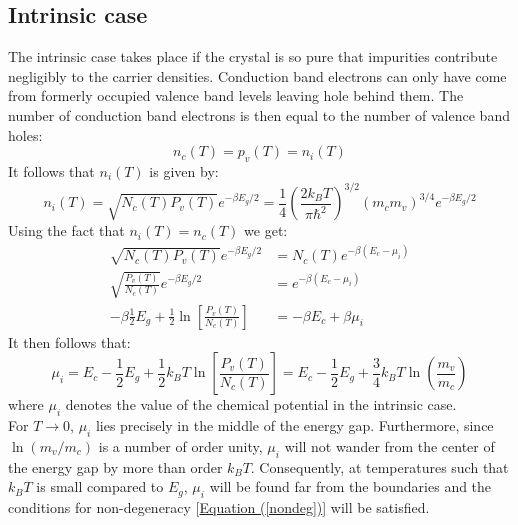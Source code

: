 \documentclass[10.75pt,a4paper,openright,bottom=2cm]{article}
\renewcommand{\refeq}[1]{\hyperref[#1]{Equation (\ref{#1})}}
\begin{document}
\subsection{Intrinsic case}
The intrinsic case takes place if the crystal is so pure that impurities contribute negligibly to the carrier densities. Conduction band electrons can only have come from formerly occupied valence band levels leaving hole behind them. The number of conduction band electrons is then equal to the number of valence band holes:
\[
n_c(T)=p_v(T)=n_i(T)
\]
It follows that $n_i(T)$ is given by:
\[
n_i(T)=\sqrt{N_c(T)P_v(T)}e^{-\beta E_g/2}=\frac{1}{4}\left(\frac{2k_BT}{\pi\hbar^2}\right)^{3/2}(m_cm_v)^{3/4}e^{-\beta E_g/2}
\]
Using the fact that $n_i(T)=n_c(T)$ we get:
\[
\begin{aligned}
\sqrt{N_c(T)P_v(T)}e^{-\beta E_g/2}&=N_c(T)e^{-\beta(E_c-\mu_i)}\\
\sqrt{\frac{P_v(T)}{N_c(T)}}e^{-\beta E_g/2}&=e^{-\beta(E_c-\mu_i)}\\
-\beta \frac{1}{2}E_g+\frac{1}{2}\ln\left[\frac{P_v(T)}{N_c(T)}\right]&=-\beta E_c+\beta\mu_i
\end{aligned}
\]
It then follows that:
\[
\mu_i=E_c-\frac{1}{2}E_g+\frac{1}{2}k_BT\ln\left[\frac{P_v(T)}{N_c(T)}\right]=E_c-\frac{1}{2}E_g+\frac{3}{4}k_BT\ln\left(\frac{m_v}{m_c}\right)
\]
where $\mu_i$ denotes the value of the chemical potential in the intrinsic case.\\
For $T\to0$, $\mu_i$ lies precisely in the middle of the energy gap. Furthermore, since $\ln(m_v/m_c)$ is a number of order unity, $\mu_i$ will not wander from the center of the energy gap by more than order $k_BT$. Consequently, at temperatures such that $k_BT$ is small compared to $E_g$, $\mu_i$ will be found far from the boundaries and the conditions for non-degeneracy [\refeq{nondeg}] will be satisfied.
\end{document}
